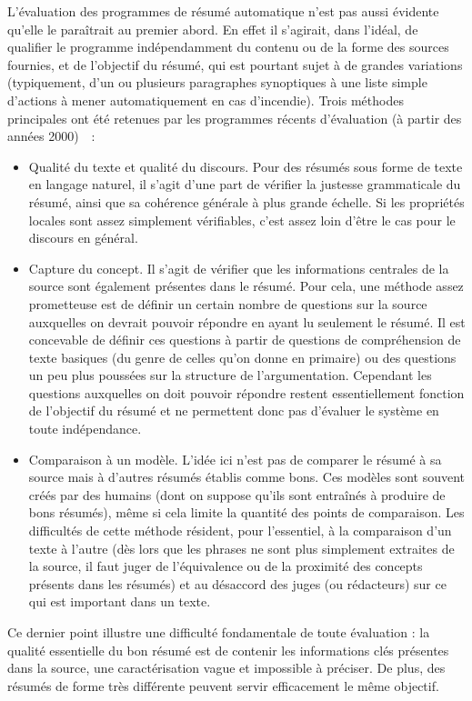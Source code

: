 \documentclass{article}           %
\begin{document}
L'évaluation des programmes de résumé automatique n'est pas aussi évidente qu'elle le paraîtrait au premier abord. En effet il s'agirait, dans l'idéal, de qualifier le programme indépendamment du contenu ou de la forme des sources fournies, et de l'objectif du résumé, qui est pourtant sujet à de grandes variations (typiquement, d'un ou plusieurs paragraphes synoptiques à une liste simple d'actions à mener automatiquement en cas d'incendie). Trois méthodes principales ont été retenues par les programmes récents d'évaluation (à partir des années 2000)~\cite[p.1453-1461]{jones_automatic_2007}~:
\begin{itemize}
  \item Qualité du texte et qualité du discours. Pour des résumés sous forme de texte en langage naturel, il s'agit d'une part de vérifier la justesse grammaticale du résumé, ainsi que sa cohérence générale à plus grande échelle. Si les propriétés locales sont assez simplement vérifiables, c'est assez loin d'être le cas pour le discours en général.
  \item Capture du concept. Il s'agit de vérifier que les informations centrales de la source sont également présentes dans le résumé. Pour cela, une méthode assez prometteuse est de définir un certain nombre de questions sur la source auxquelles on devrait pouvoir répondre en ayant lu seulement le résumé. Il est concevable de définir ces questions à partir de questions de compréhension de texte basiques (du genre de celles qu'on donne en primaire) ou des questions un peu plus poussées sur la structure de l'argumentation. Cependant les questions auxquelles on doit pouvoir répondre restent essentiellement fonction de l'objectif du résumé et ne permettent donc pas d'évaluer le système en toute indépendance.
  \item Comparaison à un modèle. L'idée ici n'est pas de comparer le résumé à sa source mais à d'autres résumés établis comme bons. Ces modèles sont souvent créés par des humains (dont on suppose qu'ils sont entraînés à produire de bons résumés), même si cela limite la quantité des points de comparaison. Les difficultés de cette méthode résident, pour l'essentiel, à la comparaison d'un texte à l'autre (dès lors que les phrases ne sont plus simplement extraites de la source, il faut juger de l'équivalence ou de la proximité des concepts présents dans les résumés) et au désaccord des juges (ou rédacteurs) sur ce qui est important dans un texte.
 \end{itemize}
  
  Ce dernier point illustre une difficulté fondamentale de toute évaluation : la qualité essentielle du bon résumé est de contenir les informations clés présentes dans la source, une caractérisation vague et impossible à préciser. De plus, des résumés de forme très différente peuvent servir efficacement le même objectif.
\end{document}
